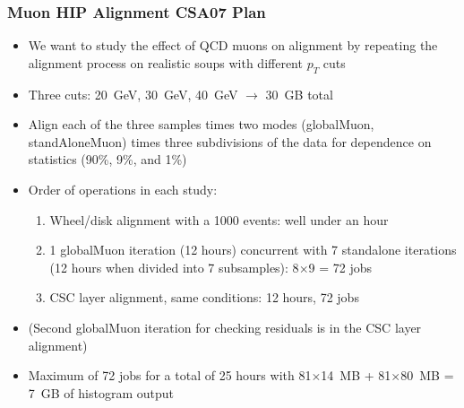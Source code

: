 \documentclass[compress]{beamer}
\begin{document}
\begin{frame}
\frametitle{Muon HIP Alignment CSA07 Plan}
\begin{itemize}
\item We want to study the effect of QCD muons on alignment by
repeating the alignment process on realistic soups with different $p_T$ cuts
\item Three cuts: 20~GeV, 30~GeV, 40~GeV $\to$ 30~GB total
\item Align each of the three samples times two modes (globalMuon,
standAloneMuon) times three subdivisions of the data for dependence on
statistics (90\%, 9\%, and 1\%)
\item Order of operations in each study:

\begin{enumerate}
\item Wheel/disk alignment with a 1000 events: well under an hour
\item 1 globalMuon iteration (12 hours) concurrent with 7 standalone
iterations (12 hours when divided into 7 subsamples): 8$\times$9 = 72 jobs
\item CSC layer alignment, same conditions: 12 hours, 72 jobs
\end{enumerate}

\item (Second globalMuon iteration for checking residuals is in the CSC
layer alignment)

\item Maximum of 72 jobs for a total of 25 hours with 81$\times$14~MB + 81$\times$80~MB = 7~GB of histogram output
\end{itemize}
\end{frame}
\end{document}
